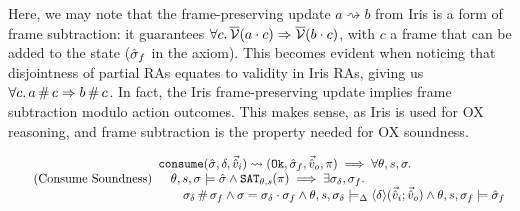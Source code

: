 Here, we may note that the frame-preserving update $a \rightsquigarrow b$ from Iris is a form of frame subtraction: it guarantees $\forall c\ldotp \overline{\cal V}(a \cdot c)\Rightarrow \overline{\cal V}(b\cdot c)$, with $c$ a frame that can be added to the state ($\hat{\sigma}_f$ in the axiom). This becomes evident when noticing that disjointness of partial RAs equates to validity in Iris RAs, giving us $\forall c\ldotp a\operatorname{\#} c\Rightarrow b\operatorname{\#} c$. In fact, the Iris frame-preserving update implies frame subtraction modulo action outcomes. This makes sense, as Iris is used for OX reasoning, and frame subtraction is the property needed for OX soundness. 

%
%
%

\begin{equation}
\tag{Consume Soundness}\label{eq:consume-sound}
\begin{array}{l}
\texttt{consume}(\hat{\sigma},\delta,\vec{\hat{v}}_i)\rightsquigarrow (\texttt{Ok},\hat{\sigma}_f,\vec{\hat{v}}_o,\pi) \implies \forall \theta,s,\sigma\ldotp \\
\quad  \theta,s,\sigma\models \hat{\sigma} \land \texttt{SAT}_{\mathit{\theta,s}}(\pi) \implies \exists \sigma_\delta, \sigma_f\ldotp\\
\qquad \sigma_\delta\operatorname{\#}\sigma_f \land \sigma=\sigma_\delta\cdot\sigma_f \land \theta, s, \sigma_\delta \models_{\Delta} \left<\delta\right>\!(\vec{\hat{v}}_i;\vec{\hat{v}}_o) \land \theta,s,\sigma_f\models \hat{\sigma}_f
\end{array}
\end{equation}

